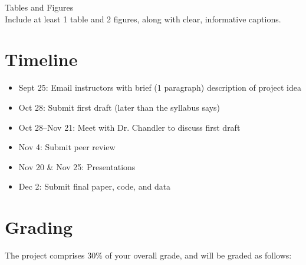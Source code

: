 \documentclass[12pt]{article}
\begin{document}
Tables and Figures \\
Include at least 1 table and 2 figures, along with
clear, informative captions. 


\section*{Timeline}

\begin{itemize}
  \item Sept 25: Email instructors with brief (1 paragraph) description
    of project idea
  \item Oct 28: Submit first draft (later than the syllabus says)
  \item Oct 28--Nov 21: Meet with Dr. Chandler to discuss first draft
  \item Nov 4: Submit peer review
  \item Nov 20 \& Nov 25: Presentations
  \item Dec 2: Submit final paper, code, and data
\end{itemize}


\section*{Grading}

The project comprises 30\% of your overall grade, and will be graded as follows:
\end{document}
